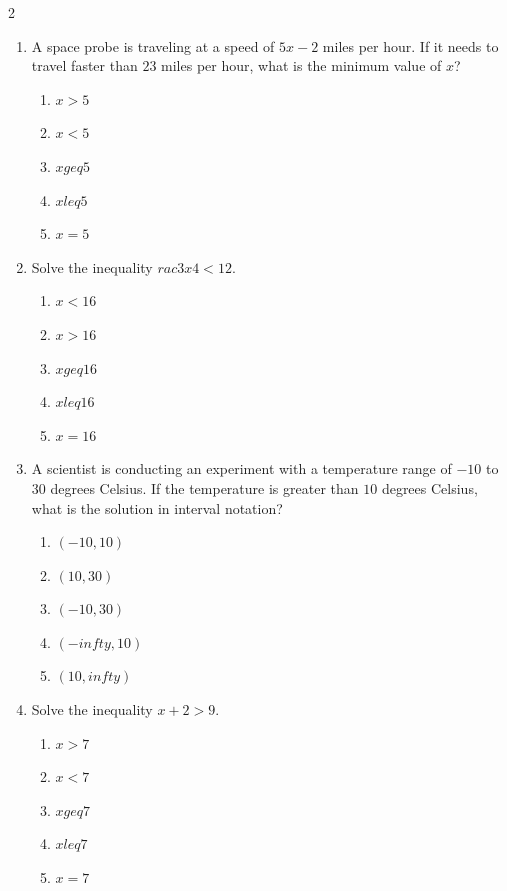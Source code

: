 \documentclass[10pt]{article}
\begin{document}
\begin{multicols}{2}
\begin{enumerate}[label=\textbf{Q\arabic*.}, leftmargin=*, itemsep=6pt, parsep=0pt]
  \item \small A space probe is traveling at a speed of $5x - 2$ miles per hour. If it needs to travel faster than $23$ miles per hour, what is the minimum value of $x$?
  \begin{enumerate}[label=(\Alph*), leftmargin=0.6cm, nosep, itemsep=2pt]
    \item $x > 5$
    \item $x < 5$
    \item $x geq 5$
    \item $x leq 5$
    \item $x = 5$
  \end{enumerate}

  \item \small Solve the inequality $rac{3x}{4} < 12$.
  \begin{enumerate}[label=(\Alph*), leftmargin=0.6cm, nosep, itemsep=2pt]
    \item $x < 16$
    \item $x > 16$
    \item $x geq 16$
    \item $x leq 16$
    \item $x = 16$
  \end{enumerate}

  \item \small A scientist is conducting an experiment with a temperature range of $-10$ to $30$ degrees Celsius. If the temperature is greater than $10$ degrees Celsius, what is the solution in interval notation?
  \begin{enumerate}[label=(\Alph*), leftmargin=0.6cm, nosep, itemsep=2pt]
    \item $(-10, 10)$
    \item $(10, 30)$
    \item $(-10, 30)$
    \item $(-infty, 10)$
    \item $(10, infty)$
  \end{enumerate}

  \item \small Solve the inequality $x + 2 > 9$.
  \begin{enumerate}[label=(\Alph*), leftmargin=0.6cm, nosep, itemsep=2pt]
    \item $x > 7$
    \item $x < 7$
    \item $x geq 7$
    \item $x leq 7$
    \item $x = 7$
  \end{enumerate}


\end{enumerate}
\end{multicols}
\end{document}
